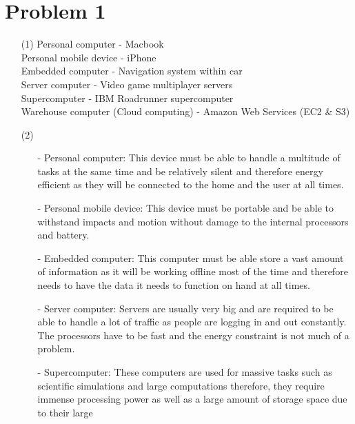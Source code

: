 \documentclass[12pt]{article}
\begin{document}
    \section*{Problem 1}
    \begin{enumerate}
        \item[(1)]
            Personal computer - Macbook \\
            Personal mobile device - iPhone \\
            Embedded computer - Navigation system within car \\
            Server computer - Video game multiplayer servers \\
            Supercomputer - IBM Roadrunner supercomputer \\
            Warehouse computer (Cloud computing) - Amazon Web Services (EC2 \&
            S3)
        \item[(2)]
            \begin{itemize}[leftmargin=*]
                \item[-] Personal computer: This device must be able to handle a
                    multitude of tasks at the same time and be relatively silent
                    and therefore energy efficient as they will be connected to
                    the home and the user at all times.
                \item[-] Personal mobile device: This device must be portable
                    and be able to withstand impacts and motion without damage
                    to the internal processors and battery.
                \item[-] Embedded computer: This computer must be able store a
                    vast amount of information as it will be working offline
                    most of the time and therefore needs to have the data it
                    needs to function on hand at all times.
                \item[-] Server computer: Servers are usually very big and are
                    required to be able to handle a lot of traffic as people are
                    logging in and out constantly. The processors have to be
                    fast and the energy constraint is not much of a problem.
                \item[-] Supercomputer: These computers are used for massive
                    tasks such as scientific simulations and large computations
                    therefore,  they require immense processing power as well as
                    a large amount of storage space due to their large

\end{itemize}
\end{enumerate}
\end{document}
